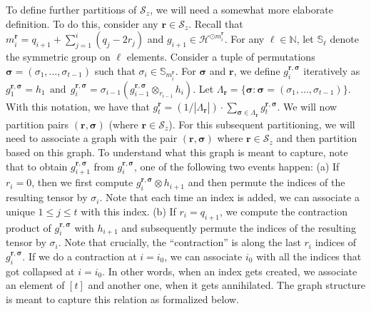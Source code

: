 \documentclass{toc}
\begin{document}
To define further partitions of $\mathcal{S}_z$, we will need a somewhat more elaborate definition. To do this, consider any $\mathbf{r} \in \mathcal{S}_z$. Recall that $m^{\mathbf{r}}_i = q_{i+1} + \sum_{j=1}^{i} (q_j - 2 r_j)$ and $g_{i+1} \in \mathcal{H}^{\odot m^{\mathbf{r}}_i}$. For any $\ell \in \mathbb{N}$, let $\mathbb{S}_\ell$ denote the symmetric group on $\ell$ elements. Consider a tuple of permutations $\boldsymbol{\sigma}= (\sigma_1, \ldots, \sigma_{t-1})$ such that $\sigma_i \in \mathbb{S}_{m^{\mathbf{r}}_i}$. For $\boldsymbol{\sigma}$ and $\mathbf{r}$, we define $g^{\mathbf{r}, \boldsymbol{\sigma}}_i$ iteratively as 
$ 
g^{\mathbf{r}, \boldsymbol{\sigma}}_1 = h_1 \ \  \textrm{and} \ \ g^{\mathbf{r}, \boldsymbol{\sigma}}_i = \sigma_{i-1}(g^{\mathbf{r}, \boldsymbol{\sigma}}_{i-1} {\otimes}_{r_{i-1}} h_i).
$
Let $\Lambda_{\mathbf{r}} = \{\boldsymbol{\sigma} : \boldsymbol{\sigma} = ( \sigma_1, \ldots, \sigma_{t-1})\}$. With this notation, we have that 
$
g^{\mathbf{r}}_t = ({1}/{|\Lambda_{\mathbf{r}}|}) \cdot \sum_{\boldsymbol{\sigma} \in \Lambda_{\mathbf{r}}} g^{\mathbf{r}, \boldsymbol{\sigma}}_t. 
$
We will now partition pairs $(\mathbf{r}, \boldsymbol{\sigma})$ (where $\mathbf{r} \in \mathcal{S}_z$). 
For this subsequent partitioning, we will need to associate a graph with the pair $(\mathbf{r}, \boldsymbol{\sigma})$ where $\mathbf{r} \in \mathcal{S}_z$ and then partition based on this graph. To understand what this graph is meant to capture, note that to obtain $g^{\mathbf{r}, \boldsymbol{\sigma}}_{i+1}$ from $g^{\mathbf{r}, \boldsymbol{\sigma}}_{i}$, one of the following two events happen: (a) If $r_i=0$, then we first compute $g^{\mathbf{r}, \boldsymbol{\sigma}}_{i} \otimes h_{i+1}$ and then permute the indices of the resulting tensor by $\sigma_i$. Note that each time an index is added, we can associate a unique $1 \le j \le t$ with this index. (b) If $r_i =q_{i+1}$, we compute the contraction product of $g^{\mathbf{r}, \boldsymbol{\sigma}}_{i}$ with $h_{i+1}$ and subsequently permute the indices of the resulting tensor by $\sigma_i$. Note that crucially, the ``contraction'' is along the last $r_i$ indices of $g^{\mathbf{r}, \boldsymbol{\sigma}}_{i}$. If we do a contraction at $i=i_0$, we can associate $i_0$ with all the indices that got collapsed at $i=i_0$. In other words, when an index gets created, we associate an element of $[t]$ and another one, when it gets annihilated. The graph structure is meant to capture this relation as formalized below. 
\end{document}
